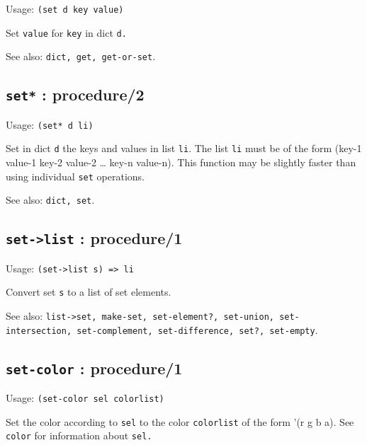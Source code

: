 \documentclass[
]{article}
\newcommand{\passthrough}[1]{#1}
\begin{document}
Usage: \passthrough{\lstinline!(set d key value)!}

Set \passthrough{\lstinline!value!} for \passthrough{\lstinline!key!} in
dict \passthrough{\lstinline!d.!}

See also: \passthrough{\lstinline!dict, get, get-or-set!}.

\hypertarget{set-procedure2-1}{%
\subsection{\texorpdfstring{\texttt{set*} :
procedure/2}{set* : procedure/2}}\label{set-procedure2-1}}

Usage: \passthrough{\lstinline!(set* d li)!}

Set in dict \passthrough{\lstinline!d!} the keys and values in list
\passthrough{\lstinline!li!}. The list \passthrough{\lstinline!li!} must
be of the form (key-1 value-1 key-2 value-2 \ldots{} key-n value-n).
This function may be slightly faster than using individual
\passthrough{\lstinline!set!} operations.

See also: \passthrough{\lstinline!dict, set!}.

\hypertarget{set-list-procedure1-1}{%
\subsection{\texorpdfstring{\texttt{set-\textgreater{}list} :
procedure/1}{set-\textgreater list : procedure/1}}\label{set-list-procedure1-1}}

Usage: \passthrough{\lstinline!(set->list s) => li!}

Convert set \passthrough{\lstinline!s!} to a list of set elements.

See also:
\passthrough{\lstinline!list->set, make-set, set-element?, set-union, set-intersection, set-complement, set-difference, set?, set-empty!}.

\hypertarget{set-color-procedure1-1}{%
\subsection{\texorpdfstring{\texttt{set-color} :
procedure/1}{set-color : procedure/1}}\label{set-color-procedure1-1}}

Usage: \passthrough{\lstinline!(set-color sel colorlist)!}

Set the color according to \passthrough{\lstinline!sel!} to the color
\passthrough{\lstinline!colorlist!} of the form '(r g b a). See
\passthrough{\lstinline!color!} for information about
\passthrough{\lstinline!sel.!}
\end{document}
